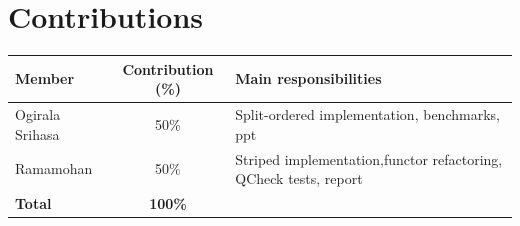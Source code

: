 \documentclass[11pt,a4paper]{article}
\begin{document}
\section*{Contributions}
\label{sec:contributions}

\begin{center}
\begin{tabular}{@{}lcl@{}}
\toprule
\textbf{Member} & \textbf{Contribution (\%)} & \textbf{Main responsibilities} \\
\midrule
Ogirala Srihasa & 50\% & Split-ordered implementation, benchmarks, ppt \\
Ramamohan       & 50\% & Striped implementation,functor refactoring, QCheck tests, report \\
\midrule
\textbf{Total} & \textbf{100\%} & \\
\bottomrule
\end{tabular}
\end{center}



\end{document}
